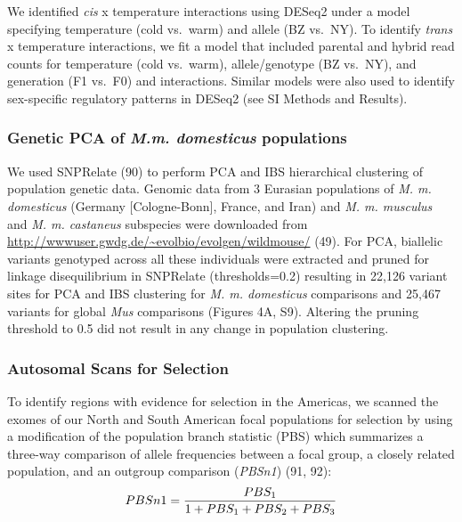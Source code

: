 \documentclass[9pt,twocolumn,twoside,lineno]{pnas-new}
\begin{document}
We identified \emph{cis} x temperature interactions using DESeq2 under a
model specifying temperature (cold vs.~warm) and allele (BZ vs.~NY). To
identify \emph{trans} x temperature interactions, we fit a model that
included parental and hybrid read counts for temperature (cold
vs.~warm), allele/genotype (BZ vs.~NY), and generation (F1 vs.~F0) and
interactions. Similar models were also used to identify sex-specific
regulatory patterns in DESeq2 (see SI Methods and Results).

\hypertarget{genetic-PCA-of-m.m-domesticus-populations}{%
\subsubsection*{\texorpdfstring{Genetic PCA of \emph{M.m. domesticus}
populations}{Genetic PCA of M.m. domesticus populations}}\label{genetic-PCA-of-m.m-domesticus-populations}}

We used SNPRelate (90) to perform PCA and IBS hierarchical clustering of
population genetic data. Genomic data from 3 Eurasian populations of
\emph{M. m. domesticus} (Germany {[}Cologne-Bonn{]}, France, and Iran)
and \emph{M. m. musculus} and \emph{M. m. castaneus} subspecies were
downloaded from \url{http://wwwuser.gwdg.de/~evolbio/evolgen/wildmouse/}
(49). For PCA, biallelic variants genotyped across all these individuals
were extracted and pruned for linkage disequilibrium in SNPRelate
(thresholds=0.2) resulting in 22,126 variant sites for PCA and IBS
clustering for \emph{M. m. domesticus} comparisons and 25,467 variants
for global \emph{Mus} comparisons (Figures 4A, S9). Altering the pruning
threshold to 0.5 did not result in any change in population clustering.

\hypertarget{autosomal-scans-for-selection}{%
\subsubsection*{Autosomal Scans for
Selection}\label{autosomal-scans-for-selection}}

To identify regions with evidence for selection in the Americas, we
scanned the exomes of our North and South American focal populations for
selection by using a modification of the population branch statistic
(PBS) which summarizes a three-way comparison of allele frequencies
between a focal group, a closely related population, and an outgroup
comparison (\emph{PBSn1}) (91, 92):
\[ PBSn1 = {PBS_1 \over 1 + PBS_1 + PBS_2 + PBS_3}  \]
\end{document}
